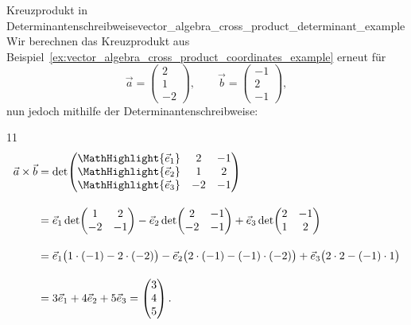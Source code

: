 \begin{ExampleBox}{Kreuzprodukt in Determinantenschreibweise}{vector_algebra_cross_product_determinant_example}
  Wir berechnen das Kreuzprodukt aus
  Beispiel~\ref{ex:vector_algebra_cross_product_coordinates_example} erneut
  für
  \[
    \vec a=\begin{pmatrix}2\\1\\-2\end{pmatrix},
    \qquad
    \vec b=\begin{pmatrix}-1\\2\\-1\end{pmatrix},
  \]
  nun jedoch mithilfe der Determinantenschreibweise:
  \begin{ClozeArea}[32]{11}
    \[
      \begin{aligned}
        \vec a\times\vec b
        &=\det\!\begin{pmatrix}
            \MathHighlight{\vec e_1}&2&-1\\
            \MathHighlight{\vec e_2}&1& 2\\
            \MathHighlight{\vec e_3}&-2&-1
          \end{pmatrix}\\[1em]
        &=\vec e_1\det\!\begin{pmatrix}1&2\\-2&-1\end{pmatrix}
          -\vec e_2\det\!\begin{pmatrix}2&-1\\-2&-1\end{pmatrix}
          +\vec e_3\det\!\begin{pmatrix}2&-1\\1&2\end{pmatrix}\\[1em]
        &=\vec e_1\bigl(1\cdot(-1)-2\cdot(-2)\bigr)
          -\vec e_2\bigl(2\cdot(-1)-(-1)\cdot(-2)\bigr)
          +\vec e_3\bigl(2\cdot2-(-1)\cdot1\bigr)  \\[1em]
        &=3\vec e_1+4\vec e_2+5\vec e_3
          =\begin{pmatrix}3\\4\\5\end{pmatrix}.
      \end{aligned}
    \]
  \end{ClozeArea}
\end{ExampleBox}
